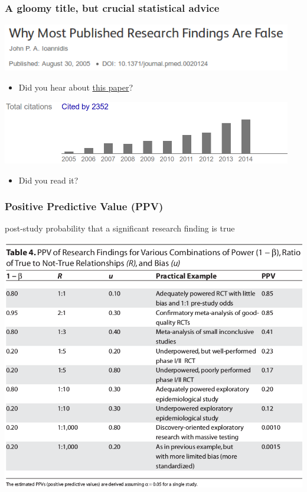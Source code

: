 \documentclass[c]{beamer} %
\begin{document}
\begin{frame}
  \frametitle{A gloomy title, but crucial statistical advice}
  \begin{center}
    \includegraphics[width=0.95\textwidth,height=0.90\textheight,keepaspectratio=true]{2005-08_JIoannidis_title}%
  \end{center}
  \pause
  \begin{itemize}
  \item Did you hear about \href{http://dx.doi.org/10.1371/journal.pmed.0020124}{this paper}?
  \end{itemize}
  \bigskip
  \pause
  \begin{center}
    \includegraphics[width=0.95\textwidth,height=0.90\textheight,keepaspectratio=true]{2005-08_JIoannidis_citations}%
  \end{center}
  \pause
  \begin{itemize}
  \item Did you read it?
  \end{itemize}
\end{frame}

\begin{frame}
  \frametitle{Positive Predictive Value (PPV)}
  post-study probability that a significant research finding is true
  \begin{center}
    \includegraphics[width=\textwidth,height=0.7\textheight,keepaspectratio=true]{ioannidis_05_false-research-findings_tab4}%
  \end{center}
\end{frame}
\end{document}
